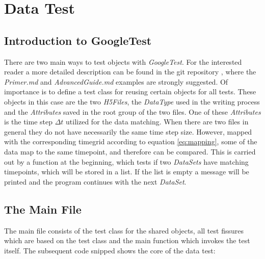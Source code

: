 \chapter{Data Test}
\label{chapt:datatest}

\section{Introduction to GoogleTest}
There are two main ways to test objects with \textit{GoogleTest}. For the interested reader a more detailed description can be found in the git repository \cite{googletestdoc}, where the \emph{Primer.md} and \emph{AdvancedGuide.md} examples are strongly suggested. Of importance is to define a test class for reusing certain objects for all tests. These objects in this case are the two \textit{H5Files}, the \textit{DataType} used in the writing process and the \textit{Attributes} saved in the root group of the two files. One of these \textit{Attributes} is the time step $\Delta t$ utilized for the data matching. When there are two files in general they do not have necessarily the same time step size. However, mapped with the corresponding timegrid according to equation \ref{eq:mapping}, some of the data map to the same timepoint, and therefore can be compared. This is carried out by a function at the beginning, which tests if two \textit{DataSets} have matching timepoints, which will be stored in a list. If the list is empty a message will be printed and the program continues with the next \textit{DataSet}.

\section{The Main File}
\label{seq:testmain}
The main file consists of the test class for the shared objects, all test fissures which are based on the test class and the main function which invokes the test itself. The subsequent code snipped shows the core of the data test:

